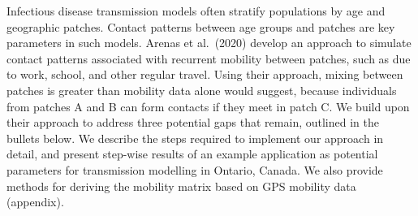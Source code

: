 Infectious disease transmission models often stratify populations by age and geographic patches.
Contact patterns between age groups and patches are key parameters in such models.
Arenas et al.\ (2020) develop an approach to simulate contact patterns associated with
recurrent mobility between patches, such as due to work, school, and other regular travel.
Using their approach, mixing between patches is greater than mobility data alone would suggest,
because individuals from patches A and B can form contacts if they meet in patch C.
We build upon their approach to address three potential gaps that remain, outlined in the bullets below.
We describe the steps required to implement our approach in detail,
and present step-wise results of an example application
as potential parameters for \sarscovii transmission modelling in Ontario, Canada. %
We also provide methods for deriving the mobility matrix based on GPS mobility data (appendix). %
